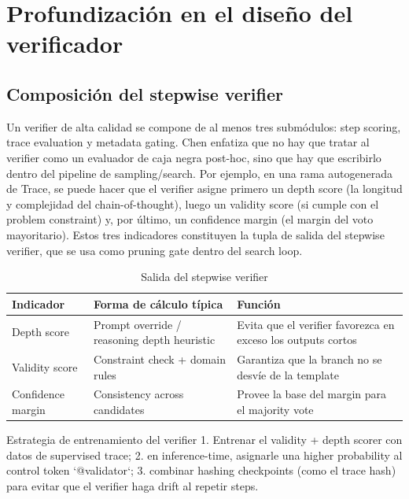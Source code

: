 \section{Profundización en el diseño del verificador}

\subsection{Composición del stepwise verifier}
Un verifier de alta calidad se compone de al menos tres submódulos: step scoring, trace evaluation y metadata gating. Chen enfatiza que no hay que tratar al verifier como un evaluador de caja negra post-hoc, sino que hay que escribirlo dentro del pipeline de sampling/search. Por ejemplo, en una rama autogenerada de Trace, se puede hacer que el verifier asigne primero un depth score (la longitud y complejidad del chain-of-thought), luego un validity score (si cumple con el problem constraint) y, por último, un confidence margin (el margin del voto mayoritario). Estos tres indicadores constituyen la tupla de salida del stepwise verifier, que se usa como pruning gate dentro del search loop.

\begin{table}[H]
\centering
\caption{Salida del stepwise verifier}
\begin{tabular}{p{}p{}p{}}
\toprule
Indicador & Forma de cálculo típica & Función \\
\midrule
Depth score & Prompt override / reasoning depth heuristic & Evita que el verifier favorezca en exceso los outputs cortos \\
Validity score & Constraint check + domain rules & Garantiza que la branch no se desvíe de la template \\
Confidence margin & Consistency across candidates & Provee la base del margin para el majority vote \\
\bottomrule
\end{tabular}
\end{table}

\begin{knowledgebox}{Estrategia de entrenamiento del verifier}
1. Entrenar el validity + depth scorer con datos de supervised trace; 2. en inference-time, asignarle una higher probability al control token `{@validator}`; 3. combinar hashing checkpoints (como el trace hash) para evitar que el verifier haga drift al repetir steps.
\end{knowledgebox}

